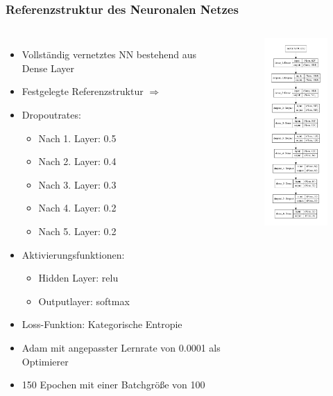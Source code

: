 \documentclass[aspectratio=1610, professionalfonts, 9pt]{beamer}
\begin{document}
\begin{frame}
 \frametitle{Referenzstruktur des Neuronalen Netzes}
 \begin{columns}
  \column{7cm}
   \begin{itemize}
  \item[\textbullet] Vollständig vernetztes NN bestehend aus Dense Layer
  \item[\textbullet] Festgelegte Referenzstruktur $\Rightarrow$
  \item[\textbullet] Dropoutrates:
  \begin{itemize}
   \item Nach 1. Layer: 0.5
   \item Nach 2. Layer: 0.4
   \item Nach 3. Layer: 0.3
   \item Nach 4. Layer: 0.2
   \item Nach 5. Layer: 0.2
  \end{itemize}
  \item[\textbullet] Aktivierungsfunktionen:
  \begin{itemize}
   \item Hidden Layer: relu
   \item Outputlayer: softmax
  \end{itemize}
  \item[\textbullet] Loss-Funktion: Kategorische Entropie
  \item[\textbullet] Adam mit angepasster Lernrate von 0.0001 als Optimierer
  \item[\textbullet] 150 Epochen mit einer Batchgröße von 100
 \end{itemize}
  \column{3cm}
  \vspace{-1cm}
  \begin{figure}
   \centering
   \includegraphics[width=3cm]{images/network_b.pdf}
   \end{figure}
 \end{columns}
 \end{frame}
\end{document}
